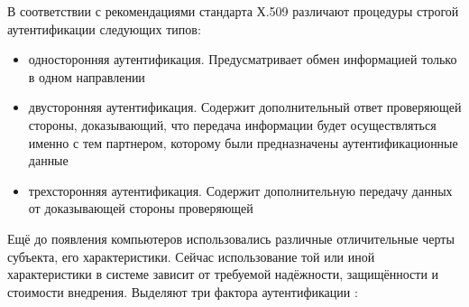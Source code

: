 В соответствии с рекомендациями стандарта Х.509 различают процедуры строгой аутентификации
следующих типов:
\begin{itemize}
    \item односторонняя аутентификация. Предусматривает обмен информацией только в одном направлении
    \item двусторонняя аутентификация. Содержит дополнительный ответ проверяющей стороны,
        доказывающий, что передача информации будет осуществляться именно с тем партнером, которому
        были предназначены аутентификационные данные
    \item трехсторонняя аутентификация. Содержит дополнительную передачу данных от доказывающей
        стороны проверяющей
\end{itemize}

Ещё до появления компьютеров использовались различные отличительные черты субъекта, его
характеристики. Сейчас использование той или иной характеристики в системе зависит от требуемой
надёжности, защищённости и стоимости внедрения. Выделяют три фактора аутентификации \cite{crypto-methods}:
